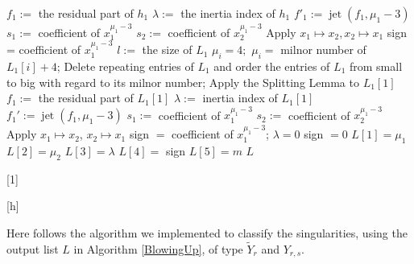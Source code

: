 \documentclass[noend]{amsproc}
\DeclareMathOperator{\jt}{jet}
\begin{document}
\begin{algorithm}[h]
\begin{algorithmic}[1]
\STATE $f_1:= $ the residual part of $h_1$
\STATE $\lambda:= $ the inertia index of $h_1$
\STATE $f'_1:=\jt(f_1,\mu_1-3)$
\STATE $s_1:=$ coefficient of $x_1^{\mu_1-3}$
\STATE $s_2:=$ coefficient of $x_2^{\mu_1-3}$
\STATE Apply $x_1\mapsto x_2, x_2\mapsto x_1$
\ENDIF
\STATE sign = coefficient of $x_1^{\mu_1-3}$
\ENDIF
\ENDFOR
{}
\STATE $l:=$ the size of $L_1$
\STATE $\mu_i=4;$
\ELSE
\STATE $\mu_i=$ milnor number of $L_1[i]+4$;\newline
\ENDIF
\ENDFOR
\STATE Delete repeating entries of $L_1$ and order the entries of
$L_1$ from small to
big with regard to its milnor number; \newline
{}
\STATE Apply the Splitting Lemma to $L_1[1]$
\STATE $f_1:=$ the residual part of $L_1[1]$
\STATE $\lambda:=$ inertia index of $L_1[1]$
\STATE $f_1':=\jt(f_1,\mu_1-3)$
\STATE $s_1:=$ coefficient of $x_1^{\mu_1-3}$
\STATE $s_2:=$ coefficient of $x_2^{\mu_1-3}$
\STATE Apply $x_1\mapsto x_2$, $x_2\mapsto x_1$
\ENDIF
\STATE sign $=$ coefficient of $x_1^{\mu_1-3}$;\newline
\ELSE
\STATE $\lambda = 0$
\STATE sign $=0$
\STATE $L[1]=\mu_1$
\STATE $L[2]=\mu_2$
\STATE $L[3]=\lambda$
\STATE $L[4]=$ sign
\STATE $L[5]=m$
\ENDIF
\ENDIF
\RETURN $L$

\end{algorithmic}[1]
\end{algorithm}[h]

Here follows the algorithm we implemented to classify the singularities, using
the output list $L$ in Algorithm \ref{BlowingUp}, of type $\widetilde Y_r$ and
$Y_{r,s}$.
\end{document}
